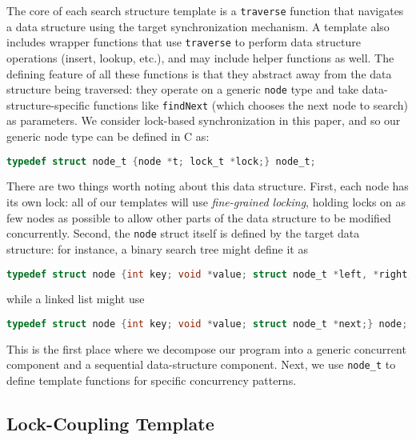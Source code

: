 \documentclass[a4paper,UKenglish,cleveref, autoref, thm-restate]{lipics-v2021}
\begin{document}
The core of each search structure template is a \lstinline{traverse} function that navigates a data structure using the target synchronization mechanism. A template also includes wrapper functions that use \lstinline{traverse} to perform data structure operations (insert, lookup, etc.), and may include helper functions as well. The defining feature of all these functions is that they abstract away from the data structure being traversed: they operate on a generic \lstinline{node} type and take data-structure-specific functions like \lstinline{findNext} (which chooses the next node to search) as parameters. We consider lock-based synchronization in this paper, and so our generic node type can be defined in C as:
\begin{lstlisting}[language = C, backgroundcolor=\color{white}, basicstyle=\ttfamily\footnotesize]
typedef struct node_t {node *t; lock_t *lock;} node_t;
\end{lstlisting}
There are two things worth noting about this data structure. First, each node has its own lock: all of our templates will use \emph{fine-grained locking}, holding locks on as few nodes as possible to allow other parts of the data structure to be modified concurrently. Second, the \lstinline{node} struct itself is defined by the target data structure: for instance, a binary search tree might define it as 
\begin{lstlisting}[language = C, backgroundcolor=\color{white}, basicstyle=\ttfamily\footnotesize]
typedef struct node {int key; void *value; struct node_t *left, *right;} node;
\end{lstlisting}
while a linked list might use
\begin{lstlisting}[language = C, backgroundcolor=\color{white}, basicstyle=\ttfamily\footnotesize]
typedef struct node {int key; void *value; struct node_t *next;} node;
\end{lstlisting}
This is the first place where we decompose our program into a generic concurrent component and a sequential data-structure component. Next, we use \lstinline{node_t} to define template functions for specific concurrency patterns.

\subsection{Lock-Coupling Template}
\label{lock-coupling-algo}
\end{document}
